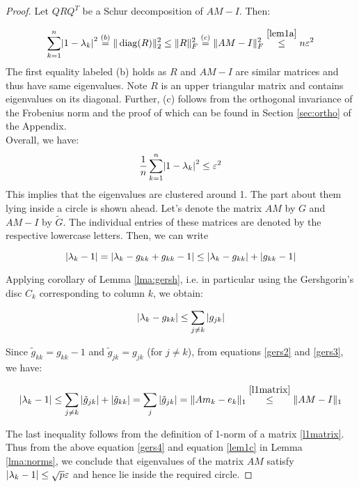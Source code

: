 \documentclass[paper=A4, fontsize=11pt]{scrartcl}
\let\originalleft\left
\let\originalright\right
\renewcommand{\left}{\mathopen{}\mathclose\bgroup\originalleft}
\renewcommand{\right}{\aftergroup\egroup\originalright}
\theoremstyle{remark}
\newcommand{\dk}{g_{kk}} %
\newcommand{\dktil}{\tilde{g}_{kk}} %
\begin{document}
\begin{proof}
	
Let $Q R Q^{T}$ be a Schur decomposition of $A M-I$. Then:

\begin{equation}
\sum_{k=1}^{n}\left|1-\lambda_{k}\right|^{2} \overset{(b)}{=} \|\operatorname{diag}(R)\|_{2}^{2} \leq\|R\|_{F}^{2} \overset{(c)}{=} \|A M-I\|_{F}^{2} \overset{\eqref{lem1a}}{\leq} n \varepsilon^{2}
\end{equation}
The first equality labeled (b) holds as $R$ and $ A M -I$ are similar matrices and thus have same eigenvalues. Note $R$ is an upper triangular matrix and contains eigenvalues on its diagonal.
Further, (c) follows from the orthogonal invariance of the Frobenius norm and the proof of which can be found in Section \ref{sec:ortho} of the Appendix. \\

Overall, we have:
\begin{equation}
\frac{1}{n} \sum_{k=1}^{n}\left|1-\lambda_{k}\right|^{2} \leq \varepsilon^{2}
\end{equation}
This implies that the eigenvalues are clustered around 1. The part about them lying inside a circle is shown ahead. Let's denote the matrix $A M$ by $G$ and $A M - I$ by $\tilde{G}$. The individual entries of these matrices are denoted by the respective lowercase letters. Then, we can write

\begin{equation}\label{gers2}
\left|\lambda_{k} - 1 \right| = \left|\lambda_{k} - \dk  + \dk - 1 \right| \leq \left|\lambda_{k} - \dk \right|  + \left|\dk - 1 \right| %
\end{equation}

Applying corollary of Lemma \ref{lma:gersh}, i.e. in particular using the Gershgorin's disc $C_k$ corresponding to column $k$, we obtain:

\begin{equation}\label{gers3}
\left|\lambda_{k} - \dk \right| \leq \sum_{j \neq k}\, \left|g_{j k}\right|
\end{equation}

Since $ \dktil = \dk - 1 $ and $\tilde{g}_{j k} = g_{j k}$ (for $j\neq k$), from equations \eqref{gers2} and \eqref{gers3}, we have:  

\begin{equation}\label{gers4}
\left|\lambda_{k} - 1 \right| \leq \sum_{j \neq k}\, \left|\tilde{g}_{j k}\right| + \left|\dktil\right| = \sum_{j }\, \left|\tilde{g}_{j k}\right| = \|A m_k -e_k\|_{1} \overset{\eqref{l1matrix}}{\leq} \|A M-I\|_{1}
\end{equation}

The last inequality follows from the definition of 1-norm of a matrix \eqref{l1matrix}. Thus from the above equation \eqref{gers4} and equation \eqref{lem1c} in Lemma \ref{lma:norms}, we conclude that eigenvalues of the matrix $A M$ satisfy $ \left|\lambda_{k} - 1 \right| \leq \sqrt{p} \varepsilon$ and hence lie inside the required circle.
\end{proof}
\end{document}
